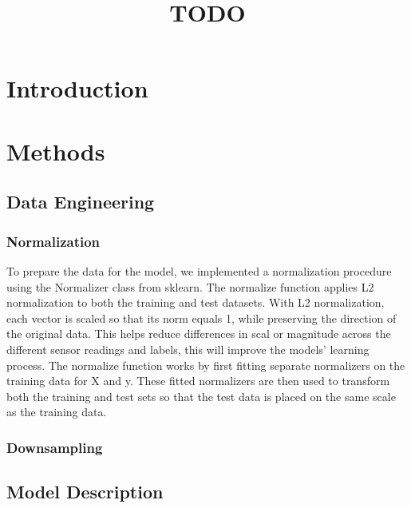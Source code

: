 \documentclass[conference]{IEEEtran}
\begin{document}
\title{TODO}

\author{
}

\maketitle

\begin{abstract}
\end{abstract}

\section{Introduction}

\section{Methods}

\subsection{Data Engineering}

\subsubsection{Normalization}
To prepare the data for the model, we implemented a normalization procedure using the Normalizer 
class from sklearn. The normalize function applies L2 normalization to both the training and test 
datasets. With L2 normalization, each vector is scaled so that its norm equals 1, while preserving 
the direction of the original data. This helps reduce differences in scal or magnitude across the 
different sensor readings and labels, this will improve the models' learning process. The normalize
function works by first fitting separate normalizers on the training data for X and y. These fitted 
normalizers are then used to transform both the training and test sets so that the test data is 
placed on the same scale as the training data.

\subsubsection{Downsampling}

\subsection{Model Description}
\end{document}

